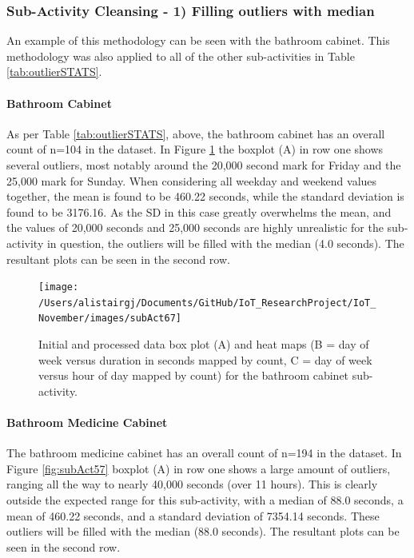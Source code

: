 \documentclass[11pt,]{article}
\let\oldparagraph\paragraph
\renewcommand{\paragraph}[1]{\oldparagraph{#1}\mbox{}}
\begin{document}
\hypertarget{sub-activity-cleansing---1-filling-outliers-with-median}{%
\subsubsection{Sub-Activity Cleansing - 1) Filling outliers with
median}\label{sub-activity-cleansing---1-filling-outliers-with-median}}

An example of this methodology can be seen with the bathroom cabinet.
This methodology was also applied to all of the other sub-activities in
Table \ref{tab:outlierSTATS}.

\hypertarget{bathroom-cabinet}{%
\paragraph{Bathroom Cabinet}\label{bathroom-cabinet}}

As per Table \ref{tab:outlierSTATS}, above, the bathroom cabinet has an
overall count of n=104 in the dataset. In Figure \ref{fig:subAct67} the
boxplot (A) in row one shows several outliers, most notably around the
20,000 second mark for Friday and the 25,000 mark for Sunday. When
considering all weekday and weekend values together, the mean is found
to be 460.22 seconds, while the standard deviation is found to be
3176.16. As the SD in this case greatly overwhelms the mean, and the
values of 20,000 seconds and 25,000 seconds are highly unrealistic for
the sub-activity in question, the outliers will be filled with the
median (4.0 seconds). The resultant plots can be seen in the second row.

\begin{figure}[H]

{\centering \texttt{[image: /Users/alistairgj/Documents/GitHub/IoT\_ResearchProject/IoT\_November/images/subAct67]} 

}

\caption{Initial and processed data box plot (A) and heat maps (B = day of week versus duration in seconds mapped by count, C = day of week versus hour of day mapped by count) for the bathroom cabinet sub-activity.}\label{fig:subAct67}
\end{figure}

\hypertarget{bathroom-medicine-cabinet}{%
\paragraph{Bathroom Medicine Cabinet}\label{bathroom-medicine-cabinet}}

The bathroom medicine cabinet has an overall count of n=194 in the
dataset. In Figure \ref{fig:subAct57} boxplot (A) in row one shows a
large amount of outliers, ranging all the way to nearly 40,000 seconds
(over 11 hours). This is clearly outside the expected range for this
sub-activity, with a median of 88.0 seconds, a mean of 460.22 seconds,
and a standard deviation of 7354.14 seconds. These outliers will be
filled with the median (88.0 seconds). The resultant plots can be seen
in the second row.
\end{document}
